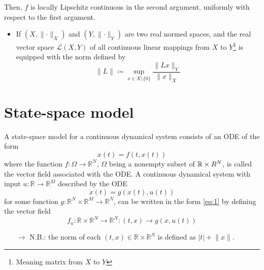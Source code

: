 \documentclass[12pt, openany]{report}
\theoremstyle{definition}
\newcommand{\R}{\mathbb{R}}
\begin{document}
Then, \(f\) is locally Lipschitz continuous in the second argument, uniformly with respect to the first argument.
\begin{itemize}
    \item If \((X,\lVert \cdot \rVert_X)\) and \((Y,\lVert \cdot \rVert_Y)\) are two real normed spaces, and the real vector space \(\mathcal{L}(X,Y)\) of all continuous linear mappings from \(X\) to \(Y\)\footnote{Meaning matrix from \(X\) to \(Y\)} is equipped with the norm defined by \[\lVert L\rVert \coloneqq \sup_{x\in X\setminus\{0\}}\frac{\lVert Lx\rVert_Y}{\lVert x\rVert_X}\]
\end{itemize}
\section{State-space model}
A state-space model for a continuous dynamical system consists of an ODE of the form 
\begin{equation}\label{eq:1}
    \dot x (t) = f(t,x(t))
\end{equation}
where the function \(f:\Omega\rightarrow \R^N\), \(\Omega\) being a nonempty subset of \(\R\times \\R^N\), is called the vector field associated with the ODE.
A continuous dynamical system with input \(u:\R\rightarrow \R^M\) described by the ODE 
\begin{equation}
    \dot x(t) = g(x(t),u(t))
\end{equation}
for some function \(g:\R^N\times \R^M\rightarrow \R^N\), can be written in the form \eqref{eq:1} by defining the vector field
\begin{equation}
    f_u :\R\times \R^N \rightarrow \R^N :(t,x) \rightarrow g(x,u(t))
\end{equation}
\begin{itemize}
    \item [\(\rightarrow\)] N.B.: the norm of each \((t,x)\in \R\times \R^N\)  is defined as \(|t|+\lVert x\rVert\).
\end{itemize}
\end{document}
